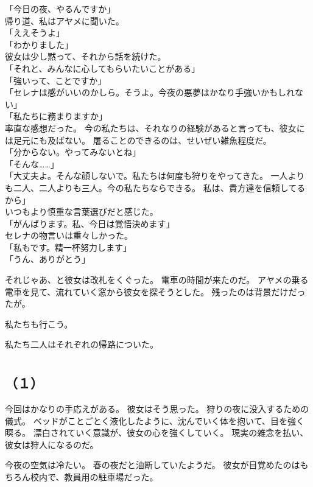 \documentclass[../IHMain]{subfiles}
\begin{document}
「今日の夜、やるんですか」\\
帰り道、私はアヤメに聞いた。\\
「ええそうよ」\\
「わかりました」\\
彼女は少し黙って、それから話を続けた。\\
「それと、みんなに心してもらいたいことがある」\\
「強いって、ことですか」\\
「セレナは感がいいのかしら。そうよ。今夜の悪夢はかなり手強いかもしれない」\\
「私たちに務まりますか」\\
率直な感想だった。
今の私たちは、それなりの経験があると言っても、彼女には足元にも及ばない。
屠ることのできるのは、せいぜい雑魚程度だ。\\
「分からない。やってみないとね」\\
「そんな……」\\
「大丈夫よ。そんな顔しないで。私たちは何度も狩りをやってきた。
一人よりも二人、二人よりも三人。今の私たちならできる。
私は、貴方達を信頼してるから」\\
いつもより慎重な言葉選びだと感じた。\\
「がんばります。私、今日は覚悟決めます」\\
セレナの物言いは重々しかった。\\
「私もです。精一杯努力します」\\
「うん、ありがとう」

それじゃあ、と彼女は改札をくぐった。
電車の時間が来たのだ。
アヤメの乗る電車を見て、流れていく窓から彼女を探そうとした。
残ったのは背景だけだったが。

私たちも行こう。

私たち二人はそれぞれの帰路についた。

\section{}
\subsection*{（１）}
今回はかなりの手応えがある。
彼女はそう思った。
狩りの夜に没入するための儀式。
ベッドがことごとく液化したように、沈んでいく体を抱いて、目を強く瞑る。
漂白されていく意識が、彼女の心を強くしていく。
現実の雑念を払い、彼女は狩人になるのだ。

今夜の空気は冷たい。
春の夜だと油断していたようだ。
彼女が目覚めたのはもちろん校内で、教員用の駐車場だった。
\end{document}
